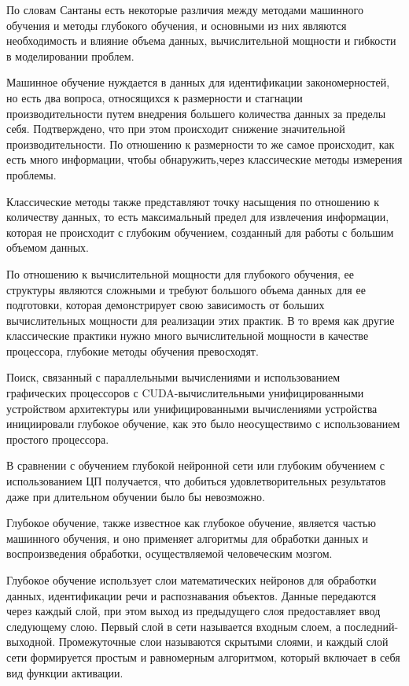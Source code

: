  По словам Сантаны есть некоторые различия между методами машинного обучения и методы глубокого обучения, 
 и основными из них являются необходимость и влияние объема данных, 
 вычислительной мощности и гибкости в моделировании проблем.

 Машинное обучение нуждается в данных для идентификации закономерностей, но есть два вопроса, 
 относящихся к размерности и стагнации производительности путем внедрения большего количества данных за пределы себя. 
 Подтверждено, что при этом происходит снижение значительной производительности. 
 По отношению к размерности то же самое происходит, как есть много информации, 
 чтобы обнаружить,через классические методы измерения проблемы. 


 Классические методы также представляют точку насыщения по отношению к количеству данных,
 то есть максимальный предел для извлечения информации, которая не происходит с глубоким обучением,
 созданный для работы с большим объемом данных.

 По отношению к вычислительной мощности для глубокого обучения, 
 ее структуры являются сложными и требуют большого объема данных для ее подготовки, 
 которая демонстрирует свою зависимость от больших вычислительных мощности для реализации этих практик. 
 В то время как другие классические практики нужно много вычислительной мощности в качестве процессора, 
 глубокие методы обучения превосходят. 

 Поиск, связанный с параллельными вычислениями и использованием графических процессоров с CUDA-вычислительными
 унифицированными устройством архитектуры или унифицированными вычислениями устройства инициировали глубокое обучение, 
 как это было неосуществимо с использованием простого процессора. 

 В сравнении с обучением глубокой нейронной сети или глубоким обучением с использованием ЦП получается, 
 что добиться удовлетворительных результатов даже при длительном обучении было бы невозможно.

 Глубокое обучение, также известное как глубокое обучение, является частью машинного обучения,
 и оно применяет алгоритмы для обработки данных и воспроизведения обработки, 
 осуществляемой человеческим мозгом.

 Глубокое обучение использует слои математических нейронов для обработки данных, идентификации речи и распознавания объектов. 
 Данные передаются через каждый слой, при этом выход из предыдущего слоя предоставляет ввод следующему слою.
 Первый слой в сети называется входным слоем, а последний-выходной.
 Промежуточные слои называются скрытыми слоями, и каждый слой сети формируется простым и равномерным алгоритмом, 
 который включает в себя вид функции активации.

